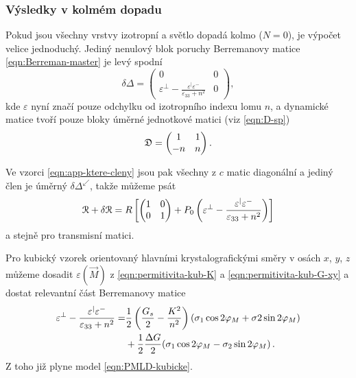 \subsubsection*{Výsledky v kolmém dopadu}

Pokud jsou všechny vrstvy izotropní a světlo dopadá kolmo ($N=0$), je výpočet velice jednoduchý.
Jediný nenulový blok poruchy Berremanovy matice \eqref{eqn:Berreman-master} je levý spodní
\begin{equation}
    \delta\Delta = \begin{pmatrix} 0 & 0\\
    \varepsilon^\perp - \frac{\varepsilon^\vert\varepsilon^-}{\varepsilon_{33}+n^2}& 0\end{pmatrix},
\end{equation}
kde $\varepsilon$ nyní značí pouze odchylku od izotropního indexu lomu $n$, a dynamické matice tvoří pouze bloky úměrné jednotkové matici (viz \eqref{eqn:D-sp})
\begin{equation}
    \mathfrak{D} = \begin{pmatrix} 1&1\\-n&n \end{pmatrix} .
\end{equation}

Ve vzorci \eqref{eqn:app-ktere-cleny} jsou pak všechny z $c$ matic diagonální a jediný člen je úměrný $\delta\Delta^\swarrow$, takže můžeme psát
\begin{equation}
    \mathcal{R} + \delta\mathcal{R} = R \left[ \begin{pmatrix} 1&0\\0&1 \end{pmatrix} + P_0 \left( \varepsilon^\perp - \frac{\varepsilon^\vert\varepsilon^-}{\varepsilon_{33}+n^2} \right) \right]
\end{equation}
a stejně pro transmisní matici.


Pro kubický vzorek orientovaný hlavními krystalografickými směry v osách $x$, $y$, $z$ můžeme dosadit $\varepsilon(\vec{M})$ z \eqref{eqn:permitivita-kub-K} a \eqref{eqn:permitivita-kub-G-xy} a dostat relevantní část Berremanovy matice
\begin{align}
    \varepsilon^\perp - \frac{\varepsilon^\vert\varepsilon^-}{\varepsilon_{33}+n^2} =& \frac{1}{2}\left( \frac{G_s}{2}-\frac{K^2}{n^2} \right) (\sigma_1\cos2\varphi_M + \sigma2\sin2\varphi_M) \\
                                                                                &+ \frac{1}{2}\frac{\Delta G}{2}(\sigma_1\cos2\varphi_M - \sigma_2 \sin2\varphi_M) \,.
\end{align}
Z toho již plyne model \eqref{eqn:PMLD-kubicke}.
